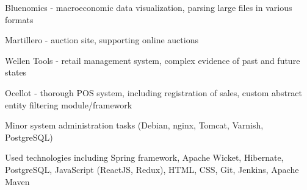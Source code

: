 \begin{cventries}
{\begin{cvitems}
        \item {Bluenomics - macroeconomic data visualization, parsing large files in various formats}
        \item {Martillero - auction site, supporting online auctions}
        \item {Wellen Tools - retail management system, complex evidence of past and future states}
        \item {Ocellot - thorough POS system, including registration of sales, custom abstract entity filtering module/framework}
        \item {Minor system administration tasks (Debian, nginx, Tomcat, Varnish, PostgreSQL)}
        \item {Used technologies including Spring framework, Apache Wicket, Hibernate, PostgreSQL, JavaScript (ReactJS, Redux), HTML, CSS, Git, Jenkins, Apache Maven}
      \end{cvitems}
    }
\end{cventries}
